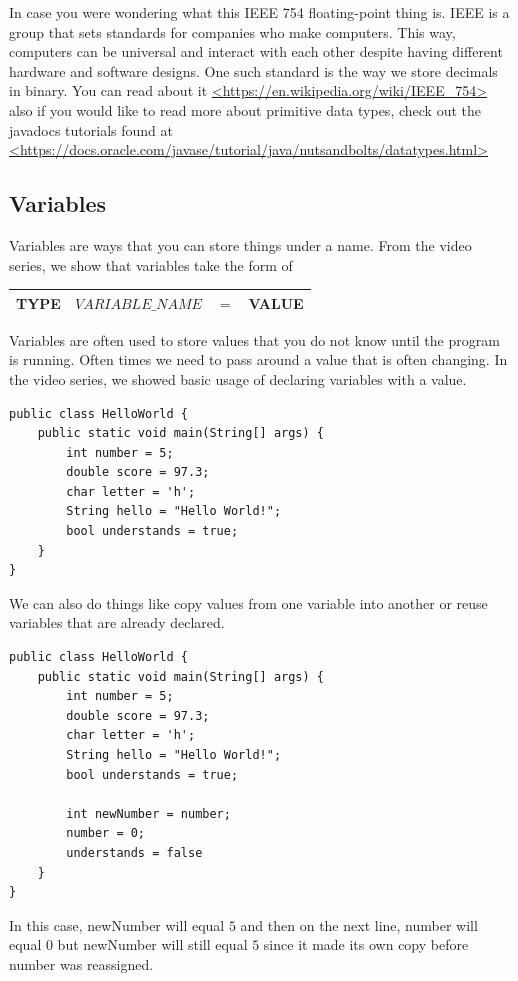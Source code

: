 \documentclass[11]{article}
\begin{document}
In case you were wondering what this IEEE 754 floating-point thing is. IEEE is  a group that sets standards for companies who make computers. This way, computers can be universal and interact with each other despite having different hardware and software designs. One such standard is the way we store decimals in binary. You can read about it \url{<https://en.wikipedia.org/wiki/IEEE_754>} also if you would like to read more about primitive data types, check out the javadocs tutorials found at \url{<https://docs.oracle.com/javase/tutorial/java/nutsandbolts/datatypes.html>} \\

\subsection{Variables}
Variables are ways that you can store things under a name. From the video series, we show that variables take the form of
\begin{center}
  \begin{tabular}{ | c | c | c | c |}
    \hline
    TYPE & $VARIABLE\_NAME$ & $=$ & VALUE  \\
    \hline
  \end{tabular}
\end{center}

Variables are often used to store values that you do not know until the program is running. Often times we need to pass around a value that is often changing. In the video series, we showed basic usage of declaring variables with a value.

\begin{lstlisting}
public class HelloWorld {
    public static void main(String[] args) {
        int number = 5;
        double score = 97.3;
        char letter = 'h';
        String hello = "Hello World!";
        bool understands = true;
    }
}
\end{lstlisting}

We can also do things like copy values from one variable into another or reuse variables that are already declared.

\begin{lstlisting}
public class HelloWorld {
    public static void main(String[] args) {
        int number = 5;
        double score = 97.3;
        char letter = 'h';
        String hello = "Hello World!";
        bool understands = true;
        
        int newNumber = number;
        number = 0;
        understands = false
    }
}
\end{lstlisting}
 In this case, newNumber will equal $5$ and then on the next line, number will equal $0$ but newNumber will still equal $5$ since it made its own copy before number was reassigned.
\end{document}
